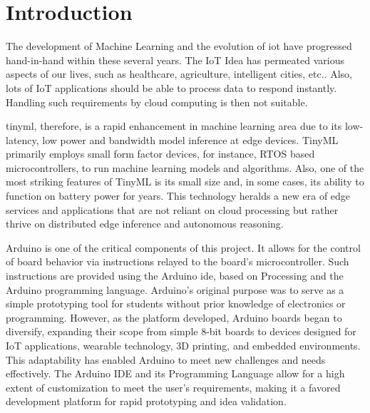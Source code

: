 %
%

\chapter{Introduction}

	The development of Machine Learning and the evolution of \ac{iot} have progressed hand-in-hand within these several years. The IoT Idea has permeated various aspects of our lives, such as healthcare, agriculture, intelligent cities, etc.\cite{Had:2020}. Also, lots of IoT applications should be able to process data to respond instantly. Handling such requirements by cloud computing is then not suitable\cite{shi:2016}.

	
	\ac{tinyml}, therefore, is a rapid enhancement in machine learning area due to its low-latency, low power and bandwidth model inference at edge devices\cite{sakr:2020}. TinyML primarily employs small form factor devices, for instance, \ac{RTOS} based microcontrollers, to run machine learning models and algorithms\cite{anh:2009}. Also, one of the most striking features of TinyML is its small size and, in some cases, its ability to function on battery power for years\cite{Aba:2023}. This technology heralds a new era of edge services and applications that are not reliant on cloud processing but rather thrive on distributed edge inference and autonomous reasoning.


	Arduino is one of the critical components of this project. It allows for the control of board behavior via instructions relayed to the board's microcontroller. Such instructions are provided using the Arduino \ac{ide}, based on Processing and the Arduino programming language. Arduino's original purpose was to serve as a simple prototyping tool for students without prior knowledge of electronics or programming. However, as the platform developed, Arduino boards began to diversify, expanding their scope from simple 8-bit boards to devices designed for IoT applications, wearable technology, 3D printing, and embedded environments\cite{kushner:2011}. This adaptability has enabled Arduino to meet new challenges and needs effectively. The Arduino IDE and its Programming Language allow for a high extent of customization to meet the user's requirements, making it a favored development platform for rapid prototyping and idea validation\cite{kushner:2011}.


